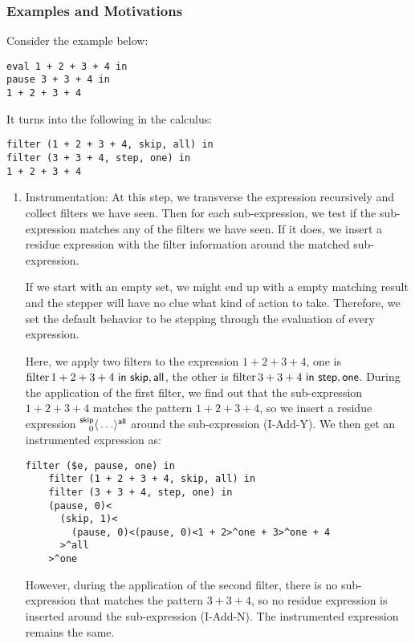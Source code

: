 \subsubsection{Examples and Motivations}

Consider the example below:
\lstset{xleftmargin=1in}
\begin{lstlisting}[language=hazel]
eval 1 + 2 + 3 + 4 in
pause 3 + 3 + 4 in
1 + 2 + 3 + 4
\end{lstlisting}

It turns into the following in the calculus:
\begin{lstlisting}[language=hazel]
filter (1 + 2 + 3 + 4, skip, all) in
filter (3 + 3 + 4, step, one) in
1 + 2 + 3 + 4
\end{lstlisting}

\begin{enumerate}
  \item Instrumentation: At this step, we transverse the expression recursively and collect filters we have seen. Then for each sub-expression, we test if the sub-expression matches any of the filters we have seen. If it does, we insert a residue expression with the filter information around the matched sub-expression.

  If we start with an empty set, we might end up with a empty matching result and the stepper will have no clue what kind of action to take. Therefore, we set the default behavior to be stepping through the evaluation of every expression.

  Here, we apply two filters to the expression \(1 + 2 + 3 + 4\), one is \(\operatorname{filter} 1 + 2 + 3 + 4 ~\mathsf{in}~ \mathsf{skip}, \mathsf{all}\), the other is \(\operatorname{filter} 3 + 3 + 4 ~\mathsf{in}~ \mathsf{step}, \mathsf{one}\). During the application of the first filter, we find out that the sub-expression \(1 + 2 + 3 + 4\) matches the pattern \(1 + 2 + 3 + 4\), so we insert a residue expression \(\prescript{\mathsf{skip}}{0}{\langle} \ldots \rangle^{\mathsf{all}}\) around the sub-expression (I-Add-Y). We then get an instrumented expression as:
  \begin{lstlisting}[language=hazel]
    filter ($e, pause, one) in
    filter (1 + 2 + 3 + 4, skip, all) in
    filter (3 + 3 + 4, step, one) in
    (pause, 0)<
      (skip, 1)<
        (pause, 0)<(pause, 0)<1 + 2>^one + 3>^one + 4
      >^all
    >^one
  \end{lstlisting}

  However, during the application of the second filter, there is no sub-expression that matches the pattern \(3 + 3 + 4\), so no residue expression is inserted around the sub-expression (I-Add-N). The instrumented expression remains the same.


\end{enumerate}
